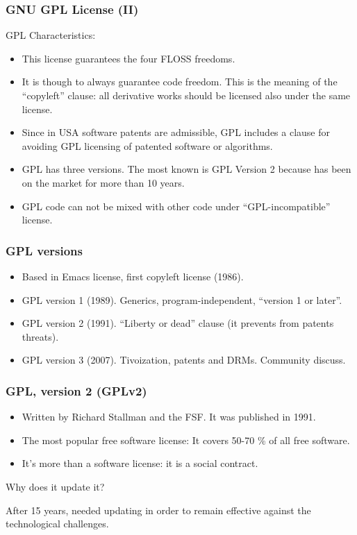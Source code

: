 \begin{frame}
\frametitle{GNU GPL License (II)}

GPL Characteristics:
\begin{itemize}
\item This license guarantees the four FLOSS freedoms.
\item It is though to always guarantee code freedom. This is the
  meaning of the ``copyleft'' clause: all derivative works should be
  licensed also under the same license.
\item Since in USA software patents are admissible, GPL includes a
  clause for avoiding GPL licensing of patented software or
  algorithms.
\item GPL has three versions. The most known is GPL Version 2 because
  has been on the market for more than 10 years. 
\item GPL code can not be mixed with other code under
  ``GPL-incompatible'' license.
\end{itemize}

\end{frame}


\begin{frame}
\frametitle{GPL versions}

\begin{itemize}
\item Based in Emacs license, first copyleft license (1986).
\item GPL version 1 (1989). Generics, program-independent, ``version 1 or later''.
\item GPL version 2 (1991). ``Liberty or dead'' clause (it prevents from patents threats).
\item GPL version 3 (2007). Tivoization, patents and DRMs. Community discuss.
\end{itemize}


\end{frame}



\begin{frame}
\frametitle{GPL, version 2 (GPLv2)}

\begin{itemize}
    \item Written by Richard Stallman and the FSF. It was published in 1991.
    \item The most popular free software license: It covers 50-70 \% of all free software.
    \item It's more than a software license: it is a social contract.


\end{itemize}

\pause

{\centerline{\large \alert{Why does it update it?}}}

\pause

After 15 years, needed updating in order to remain effective against the technological challenges.
\end{frame}


